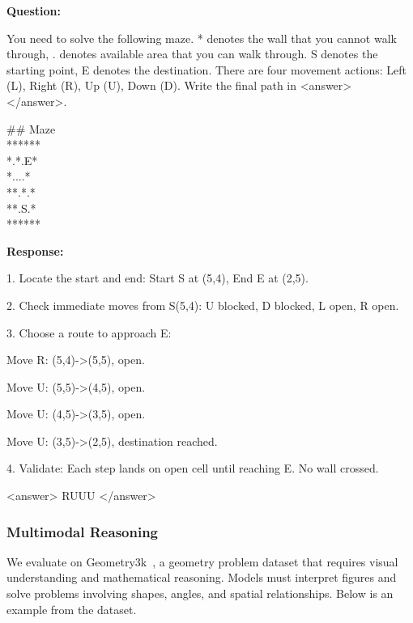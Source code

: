 \documentclass{article}
\theoremstyle{plain}
\theoremstyle{definition}
\theoremstyle{remark}
\begin{document}
\begin{tcolorbox}[
    colback=gray!5,
    colframe=gray!60,
    coltext=black,
    coltitle=white,
    title={Maze},
    fonttitle=\small\bfseries,
    boxrule=0.4pt,
    arc=2mm,
    left=4pt, right=4pt, top=4pt, bottom=4pt
]

{\small\bfseries Question:}

{\ttfamily\small You need to solve the following maze. * denotes the wall that you cannot walk through, . denotes available area that you can walk through. S denotes the starting point, E denotes the destination. There are four movement actions: Left (L), Right (R), Up (U), Down (D). Write the final path in <answer> </answer>.}

{\ttfamily\small
\#\# Maze\\
******\\
*.*.E*\\
*....*\\
**.*.*\\
**.S.*\\
******
}

{\small\bfseries Response:}

{\ttfamily\small 1. Locate the start and end: Start S at (5,4), End E at (2,5).}

{\ttfamily\small 2. Check immediate moves from S(5,4): U blocked, D blocked, L open, R open.}

{\ttfamily\small 3. Choose a route to approach E:}

{\ttfamily\small \quad Move R: (5,4)->(5,5), open.}

{\ttfamily\small \quad Move U: (5,5)->(4,5), open.}

{\ttfamily\small \quad Move U: (4,5)->(3,5), open.}

{\ttfamily\small \quad Move U: (3,5)->(2,5), destination reached.}

{\ttfamily\small 4. Validate: Each step lands on open cell until reaching E. No wall crossed.}

{\ttfamily\small <answer> RUUU </answer>}

\end{tcolorbox}

\subsubsection{Multimodal Reasoning}
\label{app:multimodal}

We evaluate on Geometry3k~\citep{lu2021intergps}, a geometry problem dataset that requires visual understanding and mathematical reasoning. Models must interpret figures and solve problems involving shapes, angles, and spatial relationships. Below is an example from the dataset.
\end{document}
